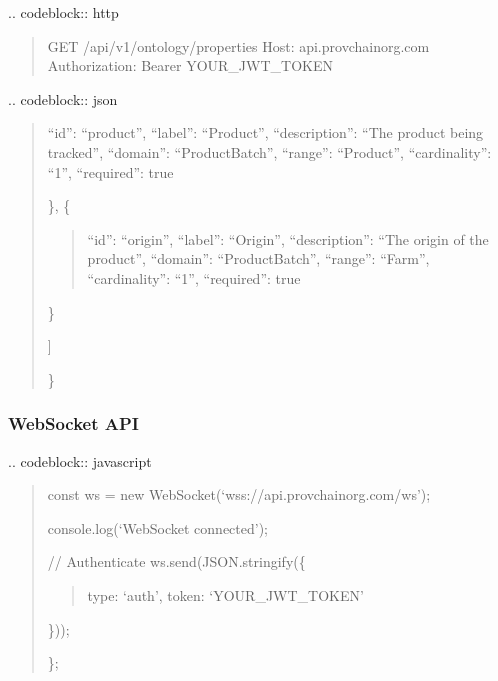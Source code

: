 \documentclass[letterpaper,10pt,english]{sphinxmanual}
\begin{document}
\sphinxAtStartPar
{}
.. code\sphinxhyphen{}block:: http
\begin{quote}

\sphinxAtStartPar
GET /api/v1/ontology/properties
Host: api.provchain\sphinxhyphen{}org.com
Authorization: Bearer YOUR\_JWT\_TOKEN
\end{quote}

\sphinxAtStartPar
{}
.. code\sphinxhyphen{}block:: json
\begin{quote}
\begin{description}
\sphinxlineitem{\{}\begin{description}
\sphinxlineitem{“properties”: {[}}\begin{description}
\sphinxlineitem{\{}
\sphinxAtStartPar
“id”: “product”,
“label”: “Product”,
“description”: “The product being tracked”,
“domain”: “ProductBatch”,
“range”: “Product”,
“cardinality”: “1”,
“required”: true

\end{description}

\sphinxAtStartPar
\},
\{
\begin{quote}

\sphinxAtStartPar
“id”: “origin”,
“label”: “Origin”,
“description”: “The origin of the product”,
“domain”: “ProductBatch”,
“range”: “Farm”,
“cardinality”: “1”,
“required”: true
\end{quote}

\sphinxAtStartPar
\}

\end{description}

\sphinxAtStartPar
{]}

\end{description}

\sphinxAtStartPar
\}
\end{quote}


\subsubsection{WebSocket API}
\label{\detokenize{api/index:websocket-api}}
\sphinxAtStartPar
{}
.. code\sphinxhyphen{}block:: javascript
\begin{quote}

\sphinxAtStartPar
const ws = new WebSocket(‘wss://api.provchain\sphinxhyphen{}org.com/ws’);
\begin{description}
\sphinxAtStartPar
console.log(‘WebSocket connected’);

\sphinxAtStartPar
// Authenticate
ws.send(JSON.stringify(\{
\begin{quote}

\sphinxAtStartPar
type: ‘auth’,
token: ‘YOUR\_JWT\_TOKEN’
\end{quote}

\sphinxAtStartPar
\}));

\end{description}

\sphinxAtStartPar
\};
\end{quote}
\end{document}
